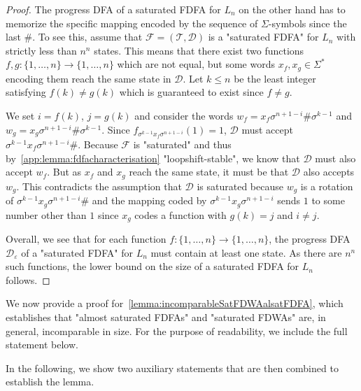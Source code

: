 \documentclass[a4paper,USenglish,cleveref,autoref,thm-restate]{lipics-v2021}
\newcommand{\mc}[1]{\ensuremath{\mathcal{#1}}}
\newcommand{\T}{\mc{T}}
\newcommand{\F}{\mc{F}}
\newcommand{\D}{\mc{D}}
\newcommand{\eps}{\ensuremath{\varepsilon}}
\begin{document}
{\begin{proof}
  The progress DFA of a saturated FDFA for $L_n$ on the other hand has to memorize the specific mapping encoded by the sequence of $\Sigma$-symbols since the last $\#$.
  To see this, assume that $\F = (\T, \D)$ is a "saturated FDFA" for $L_n$ with strictly less than $n^n$ states.
  This means that there exist two functions $f, g : \{1,\dotsc,n\} \to \{1,\dotsc,n\}$ which are not equal, but some words $x_f, x_g \in \Sigma^*$ encoding them reach the same state in $\D$.
  Let $k \leq n$ be the least integer satisfying $f(k) \neq g(k)$ which is guaranteed to exist since $f \neq g$.

  We set $i = f(k)$, $j = g(k)$ and consider the words $w_f = x_f \sigma^{n+1-i}\# \sigma^{k-1}$ and $w_g = x_g \sigma^{n+1-i}\# \sigma^{k-1}$.
  Since $f_{\sigma^{k-1} x_f \sigma^{n+1-i}}(1) = 1$, $\D$ must accept $\sigma^{k-1} x_f \sigma^{n+1-i}\#$.
  Because $\F$ is "saturated" and thus by~\cref{app:lemma:fdfacharacterisation} "loopshift-stable", we know that $\D$ must also accept $w_f$.
  But as $x_f$ and $x_g$ reach the same state, it must be that $\D$ also accepts $w_g$.
  This contradicts the assumption that $\D$ is saturated because $w_g$ is a rotation of $\sigma^{k-1} x_g \sigma^{n+1-i}\#$ and the mapping coded by $\sigma^{k-1} x_g  \sigma^{n+1-i}$ sends $1$ to some number other than $1$ since $x_g$ codes a function with $g(k) = j$ and $i \neq j$.

  Overall, we see that for each function $f : \{1,\dotsc,n\} \to \{1,\dotsc,n\}$, the progress DFA $\D_\eps$ of a "saturated FDFA" for $L_n$ must contain at least one state.
  As there are $n^n$ such functions, the lower bound on the size of a saturated FDFA for $L_n$ follows.
\end{proof}

We now provide a proof for~\cref{lemma:incomparableSatFDWAalsatFDFA}, which establishes that "almost saturated FDFAs" and "saturated FDWAs" are, in general, incomparable in size.
For the purpose of readability, we include the full statement below.

\incomparableSatFDWAalsatFDFA*

In the following, we show two auxiliary statements that are then combined to establish the lemma.

}
\end{document}
